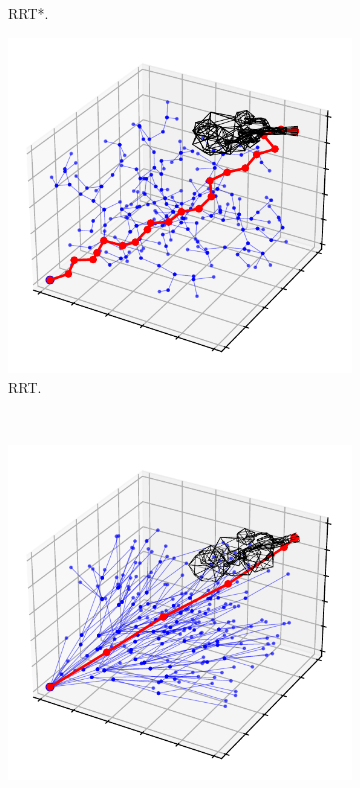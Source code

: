 \documentclass{ctuthesis}
\begin{document}
\begin{figure}[!ht]
\begin{subfigure}[b]{0.45\textwidth}
      \caption{RRT*.}
      \label{fig:rrtstarMaze}
  \end{subfigure}  
  \begin{subfigure}[b]{0.45\textwidth}
      \includegraphics[width=1.1\textwidth]{figChap3/6DRRT_new.pdf}
      \caption{RRT.}
      \label{fig:rrt6D}
  \end{subfigure}
  ~ %
  \begin{subfigure}[b]{0.45\textwidth}
      \includegraphics[width=1.1\textwidth]{figChap3/6DRRTstar3_new.pdf}

\end{subfigure}
\end{figure}
\end{document}
